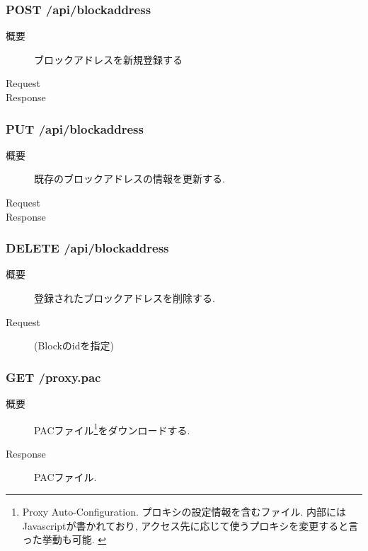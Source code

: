 \documentclass[10pt,a4paper,uplatex,a4j,dvipdfmx]{jsarticle}
\begin{document}
\begin{multicols}{2}
       \subsubsection*{POST /api/blockaddress}
         \begin{description}
            \item[概要] ブロックアドレスを新規登録する
            \item[Request] 
            \item[Response] 
          \end{description}

       \subsubsection*{PUT /api/blockaddress}
           \begin{description}
            \item[概要] 既存のブロックアドレスの情報を更新する.
            \item[Request] 
            \item[Response] 
          \end{description}

       \subsubsection*{DELETE /api/blockaddress}
           \begin{description}
            \item[概要] 登録されたブロックアドレスを削除する.
            \item[Request]  (Blockのidを指定)
          \end{description}

       \subsubsection*{GET /proxy.pac}
           \begin{description}
            \item[概要] PACファイル\footnote{Proxy Auto-Configuration. プロキシの設定情報を含むファイル. 内部にはJavascriptが書かれており, アクセス先に応じて使うプロキシを変更すると言った挙動も可能. \cite{moz:pac}}をダウンロードする.
            \item[Response] PACファイル.
          \end{description}
       

\end{multicols}
\end{document}
